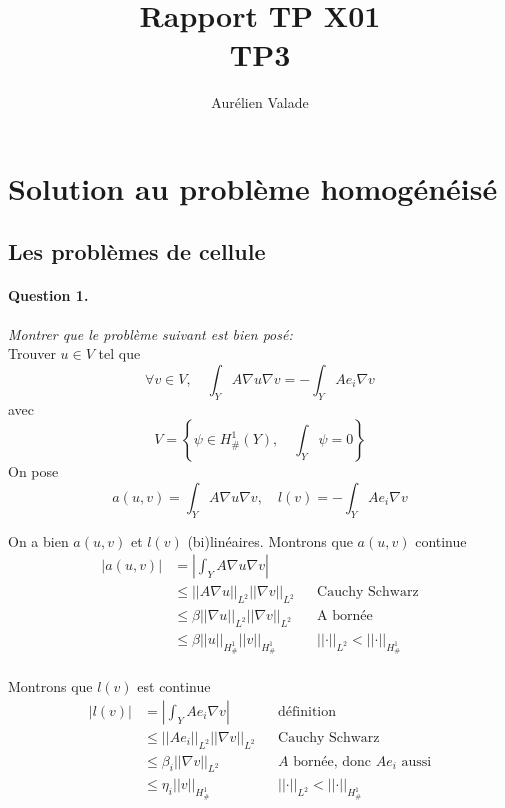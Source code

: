 \message{ !name(rapport.tex)}\documentclass[11pt]{article}
\title{Rapport TP X01 \\ TP3}
\author{Aurélien Valade}
\date{}
\newcommand{\norm}[1]{\left|\left|#1\right|\right|}
\newcommand{\question}[2]{\paragraph{Question #1.}\textit{#2} \\}
\newcommand{\Hd}{H^1_{\#}}
\begin{document}
\section{Solution au problème homogénéisé}

\subsection{Les problèmes de cellule}

\question{1}{Montrer que le problème suivant est bien posé:}

Trouver $u \in V$ tel que
\begin{equation}
  \label{eq:pbcell}
  \forall v \in V, \quad \int_Y A \nabla u \nabla v = - \int_Y A e_i \nabla v
\end{equation}
avec
\begin{equation}
  V = 
  \left\{
    \psi \in \Hd(Y), \quad \int_Y \psi = 0
  \right\}
\end{equation}
On pose
\begin{equation}
  a(u,v) = \int_Y A \nabla u \nabla v, \quad
  l(v) = -\int_Y A e_i \nabla v
\end{equation}

On a bien $a(u,v)$ et $l(v)$ (bi)linéaires. Montrons que $a(u,v)$ continue 
\begin{align}
  \label{eq:ac}
  \big|a(u,v)\big| &= \left| \int_Y A \nabla u \nabla v \right| \\
                   &\leq \norm{A\nabla u}_{L^2} \norm{\nabla v}_{L^2} && \mbox{Cauchy Schwarz} \\
                   &\leq \beta \norm{\nabla u}_{L^2} \norm{\nabla v}_{L^2} && \mbox{A bornée} \\
                   &\leq \beta \norm{u}_{\Hd} \norm{v}_{\Hd} && \norm{\cdot}_{L^2}<\norm{\cdot}_{\Hd} \\
\end{align}

Montrons que $l(v)$ est continue
\begin{align}
  \label{eq:ac}
  \big|l(v)\big| &= \left| \int_Y A e_i \nabla v \right|  && \text{définition} \\
                 &\leq \norm{Ae_i}_{L^2} \norm{\nabla v}_{L^2} && \text{Cauchy Schwarz} \\
                 &\leq \beta_i \norm{\nabla v}_{L^2} && \text{$A$ bornée, donc $A e_i$ aussi} \\
                 &\leq \eta_i \norm{v}_{\Hd} && \norm{\cdot}_{L^2}<\norm{\cdot}_{\Hd}
\end{align}
\end{document}
